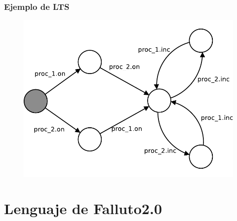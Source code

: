 \documentclass[serif]{beamer}
\begin{document}
\begin{frame}
\frametitle{Ejemplo de LTS}
\begin{figure}
  \centering
    \includegraphics[scale=0.65]{imagenes/lts.pdf}
\end{figure}
\end{frame}




\section[Lenguaje]{Lenguaje de Falluto2.0}
\end{document}
